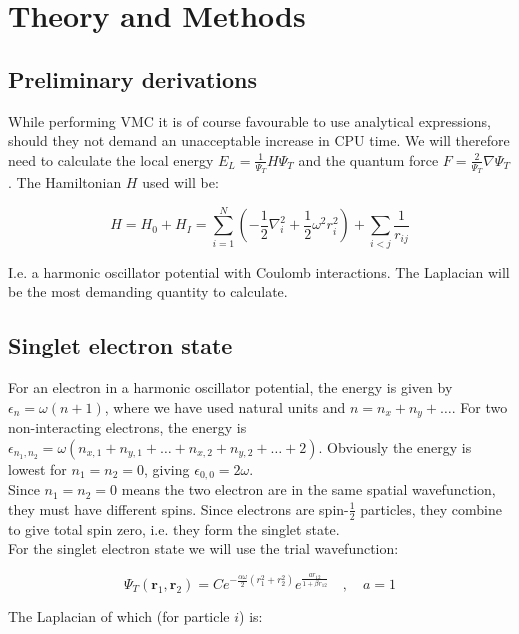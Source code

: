 \documentclass[english, a4paper]{article}
\newcommand{\bm}[1]{\mathbf{#1}}
\begin{document}
	\section{Theory and Methods}
	\subsection{Preliminary derivations}
	While performing VMC it is of course favourable to use analytical expressions, should they not demand an unacceptable increase in CPU time. We will therefore need to calculate the local energy $E_L = \frac{1}{\Psi_T}H\Psi_T$ and the quantum force $F = \frac{2}{\Psi_T}\nabla\Psi_T$. The Hamiltonian $H$ used will be:
	
	\begin{equation}
	H = H_0 + H_I = \sum_{i=1}^{N}\left(-\frac{1}{2}\nabla_i^2 + \frac{1}{2}\omega^2r_i^2\right) + \sum_{i<j}\frac{1}{r_{ij}}
	\end{equation}
	
	I.e. a harmonic oscillator potential with Coulomb interactions. The Laplacian will be the most demanding quantity to calculate.
	
	\subsection{Singlet electron state}
	For an electron in a harmonic oscillator potential, the energy is given by $\epsilon_n = \omega(n + 1)$, where we have used natural units and $n = n_x + n_y + \ldots$. For two non-interacting electrons, the energy is $\epsilon_{n_1,n_2} = \omega(n_{x,1} + n_{y,1} + \ldots + n_{x,2} + n_{y,2} + \ldots + 2)$. Obviously the energy is lowest for $n_1 = n_2 = 0$, giving $\epsilon_{0,0} = 2\omega$.\\
	Since $n_1=n_2 = 0$ means the two electron are in the same spatial wavefunction, they must have different spins. 
	Since electrons are spin-$\frac{1}{2}$ particles, they combine to give total spin zero, i.e. they form the singlet state.\\
	
	For the singlet electron state we will use the trial wavefunction:
	
	\begin{equation}
	\Psi_T(\bm{r}_1,\bm{r}_2) = Ce^{-\frac{\alpha\omega}{2}(r_1^2+r_2^2)}e^{\frac{ar_{12}}{1+\beta r_{12}}}\quad,\quad a=1 \label{TwoBodyTrailWavefunction}
	\end{equation}
	
	The Laplacian of which (for particle $i$) is:
	
\end{document}
